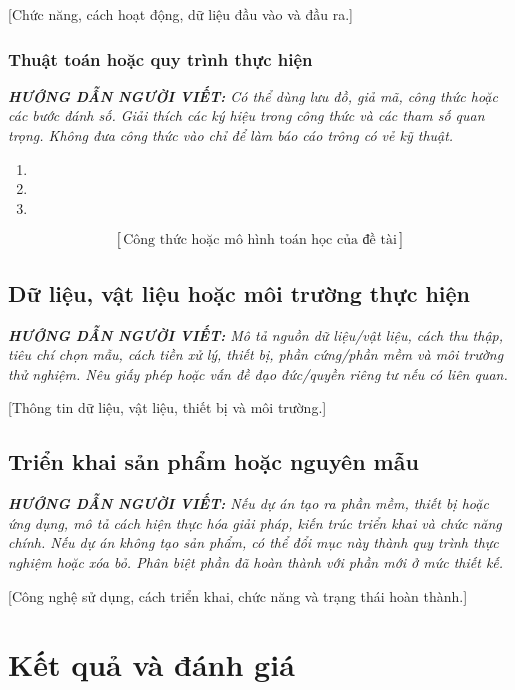 \documentclass[12pt,a4paper]{report}
\newcommand{\huongdan}[1]{%
  \par\smallskip\noindent
  \textit{\textbf{HƯỚNG DẪN NGƯỜI VIẾT:} #1}%
  \par\smallskip}
\begin{document}
[Chức năng, cách hoạt động, dữ liệu đầu vào và đầu ra.]

\subsection{Thuật toán hoặc quy trình thực hiện}

\huongdan{Có thể dùng lưu đồ, giả mã, công thức hoặc các bước đánh số.
Giải thích các ký hiệu trong công thức và các tham số quan trọng. Không
đưa công thức vào chỉ để làm báo cáo trông có vẻ kỹ thuật.}

\begin{enumerate}
  \item [Bước 1: mô tả thao tác.]
  \item [Bước 2: mô tả thao tác.]
  \item [Bước 3: mô tả thao tác.]
\end{enumerate}

\[
  [\text{Công thức hoặc mô hình toán học của đề tài}]
\]

\section{Dữ liệu, vật liệu hoặc môi trường thực hiện}

\huongdan{Mô tả nguồn dữ liệu/vật liệu, cách thu thập, tiêu chí chọn mẫu,
cách tiền xử lý, thiết bị, phần cứng/phần mềm và môi trường thử nghiệm.
Nêu giấy phép hoặc vấn đề đạo đức/quyền riêng tư nếu có liên quan.}

[Thông tin dữ liệu, vật liệu, thiết bị và môi trường.]

\section{Triển khai sản phẩm hoặc nguyên mẫu}

\huongdan{Nếu dự án tạo ra phần mềm, thiết bị hoặc ứng dụng, mô tả cách
hiện thực hóa giải pháp, kiến trúc triển khai và chức năng chính. Nếu dự án
không tạo sản phẩm, có thể đổi mục này thành quy trình thực nghiệm hoặc
xóa bỏ. Phân biệt phần đã hoàn thành với phần mới ở mức thiết kế.}

[Công nghệ sử dụng, cách triển khai, chức năng và trạng thái hoàn thành.]

\chapter{Kết quả và đánh giá}
\end{document}
